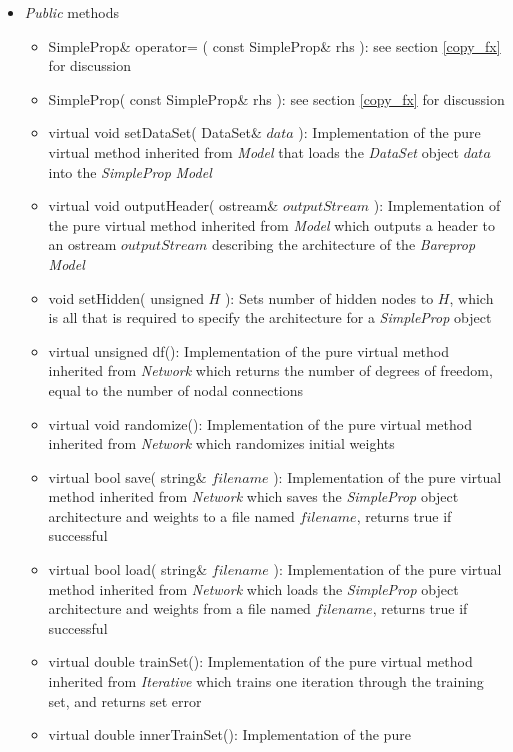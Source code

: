\documentclass{report}
\begin{document}
\begin{itemize}

\item {\em Public} methods

\begin{itemize}
\item SimpleProp\& operator= ( const SimpleProp\& rhs ): see section
      \ref{copy_fx} for discussion
\item SimpleProp( const SimpleProp\& rhs ): see section \ref{copy_fx}
      for discussion
\item virtual void setDataSet( DataSet\& $data$ ): Implementation of
      the pure virtual method inherited from {\em Model} that loads
      the {\em DataSet} object $data$ into the {\em SimpleProp} {\em
      Model}
\item virtual void outputHeader( ostream\& $outputStream$ ):
      Implementation of the pure virtual method inherited from {\em
      Model} which outputs a header to an ostream $outputStream$
      describing the architecture of the {\em Bareprop} {\em Model}
\item void setHidden( unsigned $H$ ): Sets number of hidden nodes to
      $H$, which is all that is required to specify the architecture
      for a {\em SimpleProp} object
\item virtual unsigned df(): Implementation of the pure virtual method
      inherited from {\em Network} which returns the number of degrees
      of freedom, equal to the number of nodal connections
\item virtual void randomize(): Implementation of the pure virtual
      method inherited from {\em Network} which randomizes initial
      weights
\item virtual bool save( string\& $filename$ ): Implementation of the
      pure virtual method inherited from {\em Network} which saves the
      {\em SimpleProp} object architecture and weights to a file named
      $filename$, returns true if successful
\item virtual bool load( string\& $filename$ ): Implementation of the
      pure virtual method inherited from {\em Network} which loads the
      {\em SimpleProp} object architecture and weights from a file
      named
      $filename$, returns true if successful
\item virtual double trainSet(): Implementation of the pure virtual
      method inherited from {\em Iterative} which trains one iteration
      through the training set, and returns set error
\item virtual double innerTrainSet(): Implementation of the pure

\end{itemize}
\end{itemize}
\end{document}

